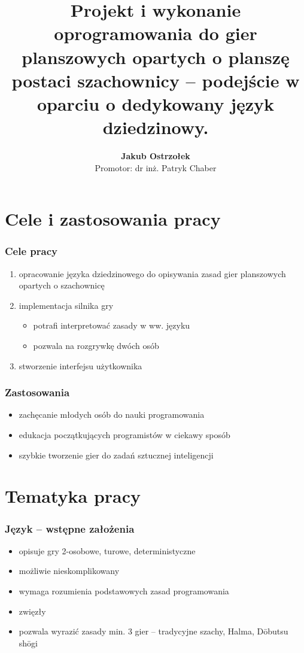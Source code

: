 \documentclass{beamer}
\title[Silnik gier opartych o szachownicę \insertframenumber/\inserttotalframenumber]{
   Projekt i wykonanie oprogramowania do gier planszowych opartych
   o planszę postaci szachownicy -- podejście w oparciu o dedykowany
   język dziedzinowy.}
\author[Jakub Ostrzołek]{\textbf{Jakub Ostrzołek} \\%
\footnotesize Promotor: dr inż. Patryk Chaber}
\institute{Instytut Automatyki i Informatyki Stosowanej\\%
Politechnika Warszawska}
\begin{document}
\frame{\titlepage}


\section{Cele i zastosowania pracy}

\begin{frame}
	\frametitle{Cele pracy}
	\begin{enumerate}
		\item opracowanie języka dziedzinowego do opisywania zasad gier planszowych opartych o szachownicę
		\item implementacja silnika gry
		      \begin{itemize}
			      \item potrafi interpretować zasady w ww. języku
			      \item pozwala na rozgrywkę dwóch osób
		      \end{itemize}
		\item stworzenie interfejsu użytkownika
	\end{enumerate}
\end{frame}

\begin{frame}
	\frametitle{Zastosowania}
	\begin{itemize}
		\item zachęcanie młodych osób do nauki programowania
		\item edukacja początkujących programistów w ciekawy sposób
		\item szybkie tworzenie gier do zadań sztucznej inteligencji
	\end{itemize}
\end{frame}

\section{Tematyka pracy}

\begin{frame}
	\frametitle{Język -- wstępne założenia}
	\begin{itemize}
		\item opisuje gry 2-osobowe, turowe, deterministyczne
		\item możliwie nieskomplikowany
		\item wymaga rozumienia podstawowych zasad programowania
		\item zwięzły
		\item pozwala wyrazić zasady min. 3 gier -- tradycyjne szachy, Halma, Dōbutsu shōgi
	\end{itemize}
\end{frame}
\end{document}
